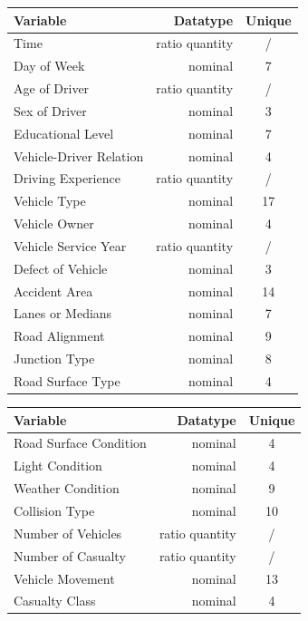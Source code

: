 \documentclass{article}
\begin{document}
\begin{table}[H]
    \parbox{.40\linewidth}{
        \begin{tabular}{l|r|c}
            \textbf{Variable} & \textbf{Datatype} &
            \textbf{Unique}\\\hline
            Time & ratio quantity & / \\
            Day of Week & nominal & 7\\
            Age of Driver & ratio quantity & /\\
            Sex of Driver & nominal & 3\\
            Educational Level & nominal &7\\
            Vehicle-Driver Relation & nominal & 4 \\
            Driving Experience & ratio quantity & /\\
            Vehicle Type & nominal & 17\\
            Vehicle Owner & nominal & 4\\
            Vehicle Service Year & ratio quantity & /\\
            Defect of Vehicle & nominal & 3 \\
            Accident Area & nominal & 14\\
            Lanes or Medians & nominal & 7\\
            Road Alignment & nominal & 9\\
            Junction Type & nominal & 8\\
            Road Surface Type & nominal  & 4
        \end{tabular}
}
    \hfill
    \parbox{.40\linewidth}{
        \begin{tabular}{l|r|c}
            \textbf{Variable} & \textbf{Datatype} &
            \textbf{Unique}\\\hline
            Road Surface Condition & nominal & 4\\
            Light Condition & nominal & 4 \\
            Weather Condition & nominal & 9\\
            Collision Type & nominal & 10 \\
            Number of Vehicles & ratio quantity & /\\
            Number of Casualty & ratio quantity & /\\
            Vehicle Movement & nominal & 13 \\
            Casualty Class & nominal & 4\\

\end{tabular}}
\end{table}
\end{document}
